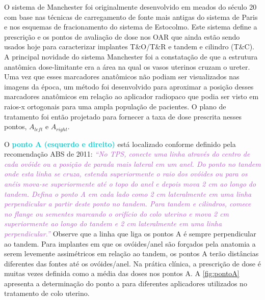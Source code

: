 \documentclass[11pt,a4paper]{article}
\begin{document}
	O sistema de Manchester foi originalmente desenvolvido em meados do século 20 com base nas técnicas de carregamento de fonte mais antigas do sistema de Paris e nos esquemas de fracionamento do sistema de Estocolmo. Este sistema define a prescrição e os pontos de avaliação de dose nos OAR que ainda estão sendo usados hoje para caracterizar implantes T\&O/T\&R e tandem e cilindro (T\&C). A principal novidade do sistema Manchester foi a constatação de que a estrutura anatômica dose-limitante era a área na qual os vasos uterinos cruzam o ureter. Uma vez que esses marcadores anatômicos não podiam ser visualizados nas imagens da época, um método foi desenvolvido para aproximar a posição desses marcadores anatômicos em relação ao aplicador radiopaco que podia ser visto em raios-x ortogonais para uma ampla população de pacientes. O plano de tratamento foi então projetado para fornecer a taxa de dose prescrita nesses pontos, $A_{left}$ e $A_{right}$.

	O \textcolor{DarkTurquoise}{\textbf{ponto A (esquerdo e direito)}} está localizado conforme definido pela recomendação ABS de 2011: \textcolor{MediumOrchid}{\textit{``No TPS, conecte uma linha através do centro de cada ovóide ou a posição de parada mais lateral em um anel. Do ponto no tandem onde esta linha se cruza, estenda superiormente o raio dos ovóides ou para os anéis mova-se superiormente até o topo do anel e depois mova 2 cm ao longo do tandem. Defina o ponto A em cada lado como 2 cm lateralmente em uma linha perpendicular a partir deste ponto no tandem. Para tandem e cilindros, comece no flange ou sementes marcando o orifício do colo uterino e mova 2 cm superiormente ao longo do tandem e 2 cm lateralmente em uma linha perpendicular.''}} Observe que a linha que liga os pontos A é sempre perpendicular ao tandem. Para implantes em que os ovóides/anel são forçados pela anatomia a serem levemente assimétricos em relação ao tandem, os pontos A terão distâncias diferentes das fontes até os ovóides/anel. Na prática clínica, a prescrição de dose é muitas vezes definida como a média das doses nos pontos A. A \ref{fig:pontoA} apresenta a determinação do ponto a para diferentes aplicadores utilizados no tratamento de colo uterino.
	
\end{document}
